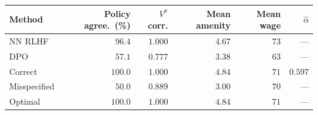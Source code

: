 \begin{tabular}{lrrrrr}
\hline
Method & Policy agree.~(\%) & $V^\pi$ corr. & Mean amenity & Mean wage & $\hat{\alpha}$ \\
\hline
NN RLHF & $96.4$ & $1.000$ & $4.67$ & $73$ & --- \\
DPO & $57.1$ & $0.777$ & $3.38$ & $63$ & --- \\
Correct & $100.0$ & $1.000$ & $4.84$ & $71$ & $0.597$ \\
Misspecified & $50.0$ & $0.889$ & $3.00$ & $70$ & --- \\
\hline
Optimal & $100.0$ & $1.000$ & $4.84$ & $71$ & --- \\
\hline
\end{tabular}
